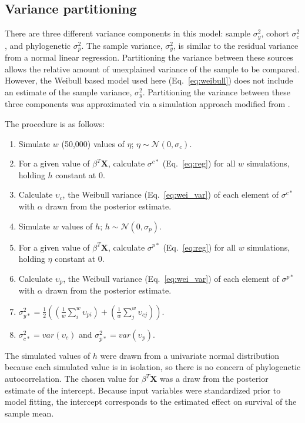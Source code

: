 \documentclass{article}
\begin{document}
\subsection{Variance partitioning}
There are three different variance components in this model: sample \(\sigma_{y}^{2}\), cohort \(\sigma_{c}^{2}\), and phylogenetic \(\sigma_{p}^{2}\). The sample variance, \(\sigma_{y}^{2}\), is similar to the residual variance from a normal linear regression. Partitioning the variance between these sources allows the relative amount of unexplained variance of the sample to be compared. However, the Weibull based model used here (Eq.~\ref{eq:weibull}) does not include an estimate of the sample variance, \(\sigma_{y}^{2}\). Partitioning the variance between these three components was approximated via a simulation approach modified from \cite{Goldstein2002}.

The procedure is as follows:
\begin{enumerate}
  \item Simulate \(w\) (50,000) values of \(\eta\); \(\eta \sim \mathcal{N}(0, \sigma_{c})\).
  \item For a given value of \(\beta^{T} \mathbf{X}\), calculate \(\sigma^{c*}\) (Eq.~\ref{eq:reg}) for all \(w\) simulations, holding \(h\) constant at 0.
  \item Calculate \(\upsilon_{c}\), the Weibull variance (Eq.~\ref{eq:wei_var}) of each element of \(\sigma^{c*}\) with \(\alpha\) drawn from the posterior estimate.
  \item Simulate \(w\) values of \(h\); \(h \sim \mathcal{N}(0, \sigma_{p})\). 
  \item For a given value of \(\beta^{T} \mathbf{X}\), calculate \(\sigma^{p*}\) (Eq.~\ref{eq:reg}) for all \(w\) simulations, holding \(\eta\) constant at 0.
  \item Calculate \(\upsilon_{p}\), the Weibull variance (Eq.~\ref{eq:wei_var}) of each element of \(\sigma^{p*}\) with \(\alpha\) drawn from the posterior estimate.
  \item \(\sigma_{y*}^{2} = \frac{1}{2} \left(\left(\frac{1}{w} \sum_{i}^{w} \upsilon_{pi}\right) + \left(\frac{1}{w} \sum_{j}^{w} \upsilon_{cj}\right)\right)\).
  \item \(\sigma_{c*}^{2} = var(\upsilon_{c})\) and \(\sigma_{p*}^{2} = var(\upsilon_{p})\).
\end{enumerate}

The simulated values of \(h\) were drawn from a univariate normal distribution because each simulated value is in isolation, so there is no concern of phylogenetic autocorrelation. The chosen value for \(\beta^{T} \mathbf{X}\) was a draw from the posterior estimate of the intercept. Because input variables were standardized prior to model fitting, the intercept corresponds to the estimated effect on survival of the sample mean.
\end{document}
